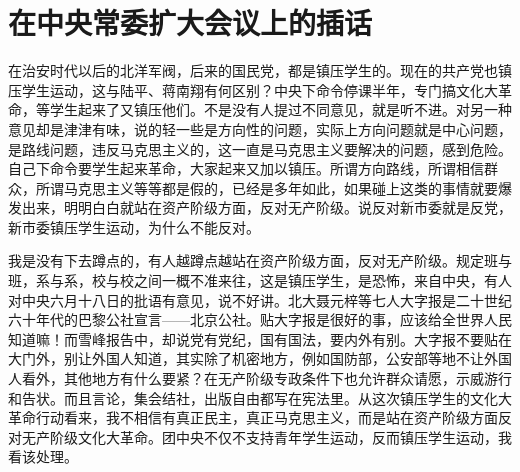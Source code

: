 \section[在中央常委扩大会议上的插话（一九六六年八月四日下午）]{在中央常委扩大会议上的插话}


在治安时代以后的北洋军阀，后来的国民党，都是镇压学生的。现在的共产党也镇压学生运动，这与陆平、蒋南翔有何区别？中央下命令停课半年，专门搞文化大革命，等学生起来了又镇压他们。不是没有人提过不同意见，就是听不进。对另一种意见却是津津有味，说的轻一些是方向性的问题，实际上方向问题就是中心问题，是路线问题，违反马克思主义的，这一直是马克思主义要解决的问题，感到危险。自己下命令要学生起来革命，大家起来又加以镇压。所谓方向路线，所谓相信群众，所谓马克思主义等等都是假的，已经是多年如此，如果碰上这类的事情就要爆发出来，明明白白就站在资产阶级方面，反对无产阶级。说反对新市委就是反党，新市委镇压学生运动，为什么不能反对。

我是没有下去蹲点的，有人越蹲点越站在资产阶级方面，反对无产阶级。规定班与班，系与系，校与校之间一概不准来往，这是镇压学生，是恐怖，来自中央，有人对中央六月十八日的批语有意见，说不好讲。北大聂元梓等七人大字报是二十世纪六十年代的巴黎公社宣言——北京公社。贴大字报是很好的事，应该给全世界人民知道嘛！而雪峰报告中，却说党有党纪，国有国法，要内外有别。大字报不要贴在大门外，别让外国人知道，其实除了机密地方，例如国防部，公安部等地不让外国人看外，其他地方有什么要紧？在无产阶级专政条件下也允许群众请愿，示威游行和告状。而且言论，集会结社，出版自由都写在宪法里。从这次镇压学生的文化大革命行动看来，我不相信有真正民主，真正马克思主义，而是站在资产阶级方面反对无产阶级文化大革命。团中央不仅不支持青年学生运动，反而镇压学生运动，我看该处理。

